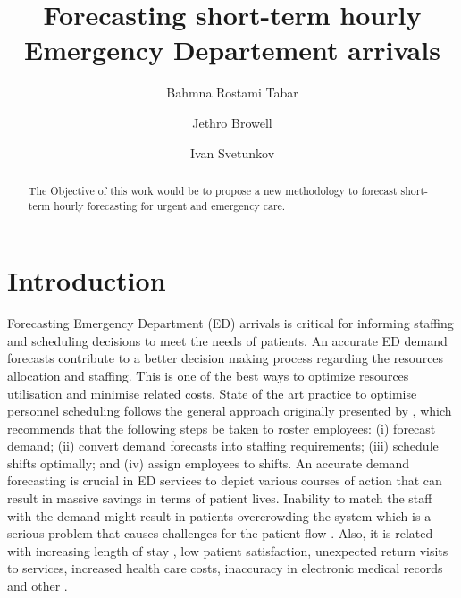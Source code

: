 \documentclass[]{elsarticle} %
\begin{document}
\begin{frontmatter}

  \title{Forecasting short-term hourly Emergency Departement arrivals}
    \author[University1]{Bahmna Rostami Tabar}
    \author[School of Mathematics and Statistics, University of Glasgow, UK]{Jethro Browell}
    \author[Centre for Marketing Analytics and Forecasting, Lancaster University, UK]{Ivan Svetunkov}
      \address[University1]{Cardiff business school, 3 Colum Drive, CF10 3EU, Cardiff}
    \address[University2]{adress2}
    \address[University3]{adress3}
  
  \begin{abstract}
  The Objective of this work would be to propose a new methodology to forecast short-term hourly forecasting for urgent and emergency care.
  \end{abstract}
  
 \end{frontmatter}

\hypertarget{introduction}{%
\section{Introduction}\label{introduction}}

Forecasting Emergency Department (ED) arrivals is critical for informing staffing and scheduling decisions to meet the needs of patients. An accurate ED demand forecasts contribute to a better decision making process regarding the resources allocation and staffing. This is one of the best ways to optimize resources utilisation and minimise related costs. State of the art practice to optimise personnel scheduling follows the general approach originally presented by \citet{vile2016time}, which recommends that the following steps be taken to roster employees: (i) forecast demand; (ii) convert demand forecasts into staffing requirements; (iii) schedule shifts optimally; and (iv) assign employees to shifts. An accurate demand forecasting is crucial in ED services to depict various courses of action that can result in massive savings in terms of patient lives. Inability to match the staff with the demand might result in patients overcrowding the system which is a serious problem that causes challenges for the patient flow \citep{derlet2002overcrowding}. Also, it is related with increasing length of stay \citep{muhammet2015forecasting}, low patient satisfaction, unexpected return visits to services, increased health care costs, inaccuracy in electronic medical records and other \citep{rostami2020anticipating}.
\end{document}
